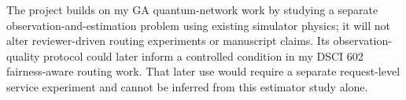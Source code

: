 \documentclass[10pt,onecolumn]{IEEEtran}
\begin{document}
The project builds on my GA quantum-network work by studying a separate observation-and-estimation problem using existing simulator physics; it will not alter reviewer-driven routing experiments or manuscript claims. Its observation-quality protocol could later inform a controlled condition in my DSCI 602 fairness-aware routing work. That later use would require a separate request-level service experiment and cannot be inferred from this estimator study alone.
\end{document}
